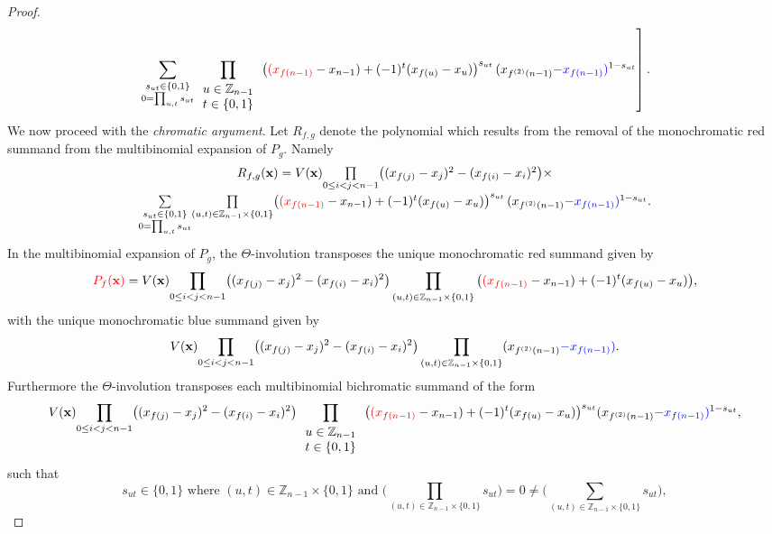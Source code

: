 \begin{proof}
\[\]
\[
\left.\sum_{\substack{s_{ut}\in\{0,1\}\\
0=\prod_{u,t}s_{ut}
}
}\prod_{\begin{array}{c}
u\in\mathbb{Z}_{n-1}\\
t\in\{0,1\}
\end{array}}\big({\color{red}(x_{f(n-1)}}-x_{n-1})+(-1)^{t}(x_{f(u)}-x_{u})\big)^{s_{ut}}\,(x_{f^{(2)}(n-1)}{\color{blue}-x_{f(n-1)}}{\color{blue})}^{1-s_{ut}}\right].
\]
We now proceed with the \emph{chromatic argument}. Let $R_{f,g}$ denote the polynomial which results from the removal of the monochromatic red summand from the multibinomial expansion of $P_{g}$. Namely
\[
\begin{array}{c}
R_{f,g}(\mathbf{x})=V(\mathbf{x})\underset{0\le i<j<n-1}{\prod}\big((x_{f(j)}-x_{j})^{2}-(x_{f(i)}-x_{i})^{2}\big)\times\\[10pt]
\underset{\substack{s_{ut}\in\{0,1\}\\
0=\prod_{u,t}s_{ut}
}
}{\sum}\underset{(u,t)\in\mathbb{Z}_{n-1}\times\{0,1\}}{\prod}\big({\color{red}(x_{f(n-1)}}-x_{n-1})+(-1)^{t}(x_{f(u)}-x_{u})\big)^{s_{ut}}\,(x_{f^{(2)}(n-1)}{\color{blue}-x_{f(n-1)}}{\color{blue})}^{1-s_{ut}}.\\[10pt]
\end{array}
\]
In the multibinomial expansion of $P_{g}$, the $\Theta$-involution transposes the unique monochromatic red summand given by
\[
{\color{red}P_{f}(\mathbf{x})}=V(\mathbf{x})\underset{0\le i<j<n-1}{\prod}\big((x_{f(j)}-x_{j})^{2}-(x_{f(i)}-x_{i})^{2}\big)\prod_{(u,t)\in\mathbb{Z}_{n-1}\times\{0,1\}}\big({\color{red}(x_{f(n-1)}}-x_{n-1})+(-1)^{t}(x_{f(u)}-x_{u})\big),
\]
with the unique monochromatic blue summand given by
\[
V(\mathbf{x})\underset{0\le i<j<n-1}{\prod}\big((x_{f(j)}-x_{j})^{2}-(x_{f(i)}-x_{i})^{2}\big)\prod_{(u,t)\in\mathbb{Z}_{n-1}\times\{0,1\}}(x_{f^{(2)}(n-1)}{\color{blue}-x_{f(n-1)}}{\color{blue})}.
\]
Furthermore the $\Theta$-involution transposes each multibinomial bichromatic summand of the form
\[
V(\mathbf{x})\underset{0\le i<j<n-1}{\prod}\big((x_{f(j)}-x_{j})^{2}-(x_{f(i)}-x_{i})^{2}\big)\prod_{\begin{array}{c}
u\in\mathbb{Z}_{n-1}\\
t\in\{0,1\}
\end{array}}\big({\color{red}(x_{f(n-1)}}-x_{n-1})+(-1)^{t}(x_{f(u)}-x_{u})\big)^{s_{ut}}(x_{f^{(2)}(n-1)}{\color{blue}-x_{f(n-1)}}{\color{blue})}^{1-s_{ut}},
\]
such that
\[
s_{ut}\in\{0,1\}\text{ where }(u,t)\in\mathbb{Z}_{n-1}\times\{0,1\}\text{ and }\bigg(\prod_{(u,t)\in\mathbb{Z}_{n-1}\times\{0,1\}}s_{ut}\bigg)=0\ne\bigg(\sum_{(u,t)\in\mathbb{Z}_{n-1}\times\{0,1\}}s_{ut}\bigg),
\]
\end{proof}
